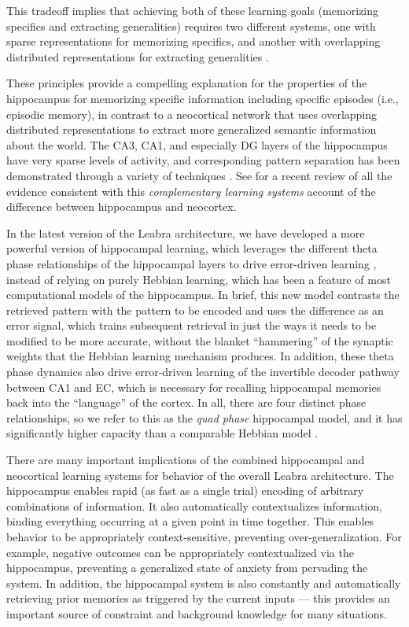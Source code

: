 \documentclass[11pt,twoside]{article}
\begin{document}
This tradeoff implies that achieving both of these learning goals
 (memorizing specifics and extracting generalities) requires two
 different systems, one with sparse representations for memorizing
 specifics, and another with overlapping distributed representations
 for extracting generalities
 \cite{McClellandMcNaughtonOReilly95,SherrySchacter87}.

These principles provide a compelling explanation for the properties
of the hippocampus for memorizing specific information including
specific episodes (i.e., episodic memory), in contrast to a
neocortical network that uses overlapping distributed representations
to extract more generalized semantic information about the world.  The
CA3, CA1, and especially DG layers of the hippocampus have very sparse
levels of activity, and corresponding pattern separation has been
demonstrated through a variety of techniques
\cite{GilbertKesnerLee01,LeutgebLeutgebMoserEtAl07,McHughJonesQuinnEtAl07,BakkerKirwanMillerEtAl08}.
See  for a recent review of
all the evidence consistent with this {\em complementary learning
  systems} account of the difference between hippocampus and
neocortex.

In the latest version of the Leabra architecture, we have developed a
more powerful version of hippocampal learning, which leverages the
different theta phase relationships of the hippocampal layers to drive
error-driven learning \cite{KetzEtAlInPrep}, instead of relying on
purely Hebbian learning, which has been a feature of most
computational models of the hippocampus.  In brief, this new model
contrasts the retrieved pattern with the pattern to be encoded and
uses the difference as an error signal, which trains subsequent
retrieval in just the ways it needs to be modified to be more
accurate, without the blanket ``hammering'' of the synaptic weights
that the Hebbian learning mechanism produces.  In addition, these
theta phase dynamics also drive error-driven learning of the
invertible decoder pathway between CA1 and EC, which is necessary for
recalling hippocampal memories back into the ``language'' of the
cortex.  In all, there are four distinct phase relationships, so we
refer to this as the {\em quad phase} hippocampal model, and it has
significantly higher capacity than a comparable Hebbian model
\cite{KetzEtAlInPrep}.

There are many important implications of the combined hippocampal and
neocortical learning systems for behavior of the overall Leabra
architecture.  The hippocampus enables rapid (as fast as a single
trial) encoding of arbitrary combinations of information.  It also
automatically contextualizes information, binding everything occurring
at a given point in time together.  This enables behavior to be
appropriately context-sensitive, preventing over-generalization.  For
example, negative outcomes can be appropriately contextualized via the
hippocampus, preventing a generalized state of anxiety from pervading
the system.  In addition, the hippocampal system is also constantly
and automatically retrieving prior memories as triggered by the
current inputs --- this provides an important source of constraint and
background knowledge for many situations.
\end{document}
